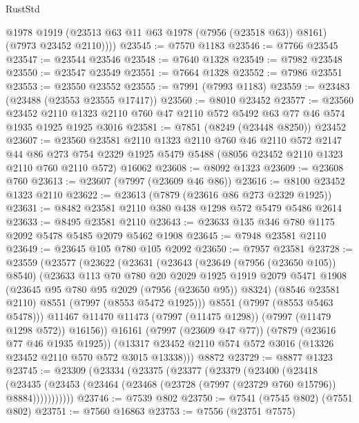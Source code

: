\begin{lexlean}{RustStd}
\begin{coremodule}
{\begin{coremodule}
{{{{{{{{{{{{{{{{{{{{{{{{{{{{{{{{{{{{{{{{{{{          @1978
          @1919
          (@23513 @63 @11 @63 @1978 (@7956 (@23518 @63)) @8161)
          (@7973 @23452 @2110))))
@23545 := @7570 @1183
@23546 := @7766 @23545
@23547 := @23544 @23546
@23548 := @7640 @1328
@23549 := @7982 @23548
@23550 := @23547 @23549
@23551 := @7664 @1328
@23552 := @7986 @23551
@23553 := @23550 @23552
@23555 := @7991 (@7993 @1183)
@23559 := @23483 (@23488 (@23553 @23555 @17417))
@23560 := @8010 @23452
@23577 := @23560
    @23452
    @2110
    @1323
    @2110
    @760
    @47
    @2110
    @572
    @5492
    @63
    @77
    @46
    @574
    @1935
    @1925
    @1925
    @3016
@23581 := @7851 (@8249 (@23448 @8250)) @23452
@23607 := @23560
    @23581
    @2110
    @1323
    @2110
    @760
    @46
    @2110
    @572
    @2147
    @44
    @86
    @273
    @754
    @2329
    @1925
    @5479
    @5488
    (@8056 @23452 @2110 @1323 @2110 @760 @2110 @572)
    @16062
@23608 := @8092 @1323
@23609 := @23608 @760
@23613 := @23607 (@7997 (@23609 @46 @86))
@23616 := @8100 @23452 @1323 @2110
@23622 := @23613 (@7879 (@23616 @86 @273 @2329 @1925))
@23631 := @8482 @23581 @2110 @380 @438 @1298 @572 @5479 @5486 @2614
@23633 := @8495 @23581 @2110
@23643 := @23633 @135 @346 @780 @1175 @2092 @5478 @5485 @2079 @5462 @1908
@23645 := @7948 @23581 @2110
@23649 := @23645 @105 @780 @105 @2092
@23650 := @7957 @23581
@23728 := @23559
    (@23577
      (@23622
        (@23631
          (@23643
            (@23649 (@7956 (@23650 @105)) @8540)
            (@23633
              @113
              @70
              @780
              @20
              @2029
              @1925
              @1919
              @2079
              @5471
              @1908
              (@23645 @95 @780 @95 @2029 (@7956 (@23650 @95)) @8324)
              (@8546 @23581 @2110)
              @8551
              (@7997 (@8553 @5472 @1925)))
            @8551
            (@7997 (@8553 @5463 @5478)))
          @11467
          @11470
          @11473
          (@7997 (@11475 @1298))
          (@7997 (@11479 @1298 @572))
          @16156))
      @16161
      (@7997 (@23609 @47 @77))
      (@7879 (@23616 @77 @46 @1935 @1925))
      (@13317 @23452 @2110 @574 @572 @3016 (@13326 @23452 @2110 @570 @572 @3015 @13338)))
    @8872
@23729 := @8877 @1323
@23745 := @23309
    (@23334
      (@23375
        (@23377
          (@23379
            (@23400
              (@23418
                (@23435
                  (@23453 (@23464 (@23468 (@23728 (@7997 (@23729 @760 @15796)) @8884)))))))))))
@23746 := @7539 @802
@23750 := @7541 (@7545 @802) (@7551 @802)
@23751 := @7560 @16863
@23753 := @7556 (@23751 @7575)
}}}}}}}}}}}}}}}}}}}}}}}}}}}}}}}}}}}}}}}}}}}
\end{coremodule}}
\end{coremodule}
\end{lexlean}
